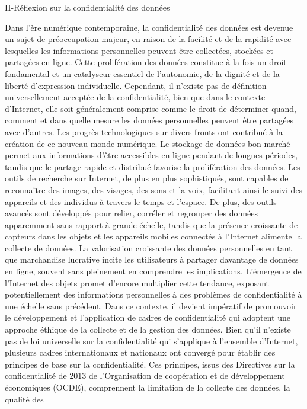 \documentclass[
]{article}
\begin{document}
II-Réflexion sur la confidentialité des données

Dans l'ère numérique contemporaine, la confidentialité des données est
devenue un sujet de préoccupation majeur, en raison de la facilité et de
la rapidité avec lesquelles les informations personnelles peuvent être
collectées, stockées et partagées en ligne. Cette prolifération des
données constitue à la fois un droit fondamental et un catalyseur
essentiel de l'autonomie, de la dignité et de la liberté d'expression
individuelle. Cependant, il n'existe pas de définition universellement
acceptée de la confidentialité, bien que dans le contexte d'Internet,
elle soit généralement comprise comme le droit de déterminer quand,
comment et dans quelle mesure les données personnelles peuvent être
partagées avec d'autres. Les progrès technologiques sur divers fronts
ont contribué à la création de ce nouveau monde numérique. Le stockage
de données bon marché permet aux informations d'être accessibles en
ligne pendant de longues périodes, tandis que le partage rapide et
distribué favorise la prolifération des données. Les outils de recherche
sur Internet, de plus en plus sophistiqués, sont capables de reconnaître
des images, des visages, des sons et la voix, facilitant ainsi le suivi
des appareils et des individus à travers le temps et l'espace. De plus,
des outils avancés sont développés pour relier, corréler et regrouper
des données apparemment sans rapport à grande échelle, tandis que la
présence croissante de capteurs dans les objets et les appareils mobiles
connectés à l'Internet alimente la collecte de données. La valorisation
croissante des données personnelles en tant que marchandise lucrative
incite les utilisateurs à partager davantage de données en ligne,
souvent sans pleinement en comprendre les implications. L'émergence de
l'Internet des objets promet d'encore multiplier cette tendance,
exposant potentiellement des informations personnelles à des problèmes
de confidentialité à une échelle sans précédent. Dans ce contexte, il
devient impératif de promouvoir le développement et l'application de
cadres de confidentialité qui adoptent une approche éthique de la
collecte et de la gestion des données. Bien qu'il n'existe pas de loi
universelle sur la confidentialité qui s'applique à l'ensemble
d'Internet, plusieurs cadres internationaux et nationaux ont convergé
pour établir des principes de base sur la confidentialité. Ces
principes, issus des Directives sur la confidentialité de 2013 de
l'Organisation de coopération et de développement économiques (OCDE),
comprennent la limitation de la collecte des données, la qualité des
\end{document}
